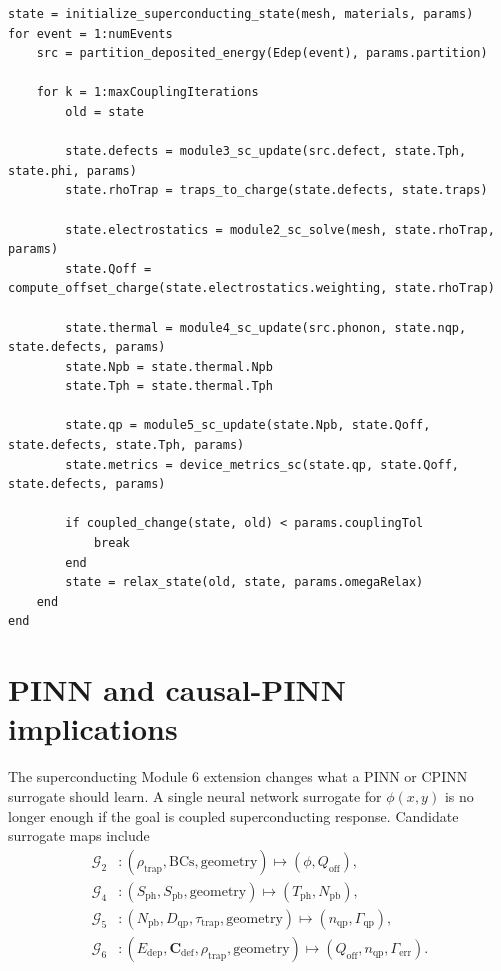 \documentclass[11pt]{article}
\newcommand{\Edep}{E_{\mathrm{dep}}}
\newcommand{\phiE}{\phi}
\newcommand{\Qoff}{Q_{\mathrm{off}}}
\newcommand{\Cvec}{\bm{C}_{\mathrm{def}}}
\newcommand{\Tph}{T_{\mathrm{ph}}}
\newcommand{\Npb}{N_{\mathrm{pb}}}
\newcommand{\nqp}{n_{\mathrm{qp}}}
\newcommand{\Dqp}{D_{\mathrm{qp}}}
\newcommand{\tautrap}{\tau_{\mathrm{trap}}}
\newcommand{\Gammaqp}{\Gamma_{\mathrm{qp}}}
\newcommand{\Gammaerr}{\Gamma_{\mathrm{err}}}
\begin{document}
\begin{verbatim}
state = initialize_superconducting_state(mesh, materials, params)
for event = 1:numEvents
    src = partition_deposited_energy(Edep(event), params.partition)

    for k = 1:maxCouplingIterations
        old = state

        state.defects = module3_sc_update(src.defect, state.Tph, state.phi, params)
        state.rhoTrap = traps_to_charge(state.defects, state.traps)

        state.electrostatics = module2_sc_solve(mesh, state.rhoTrap, params)
        state.Qoff = compute_offset_charge(state.electrostatics.weighting, state.rhoTrap)

        state.thermal = module4_sc_update(src.phonon, state.nqp, state.defects, params)
        state.Npb = state.thermal.Npb
        state.Tph = state.thermal.Tph

        state.qp = module5_sc_update(state.Npb, state.Qoff, state.defects, state.Tph, params)
        state.metrics = device_metrics_sc(state.qp, state.Qoff, state.defects, params)

        if coupled_change(state, old) < params.couplingTol
            break
        end
        state = relax_state(old, state, params.omegaRelax)
    end
end
\end{verbatim}

\section{PINN and causal-PINN implications}

The superconducting Module 6 extension changes what a PINN or CPINN surrogate should learn. A single neural network surrogate for \(\phiE(x,y)\) is no longer enough if the goal is coupled superconducting response. Candidate surrogate maps include
\begin{align}
\mathcal{G}_2 &: (\rho_{\mathrm{trap}},\mathrm{BCs},\mathrm{geometry})\mapsto (\phiE,\Qoff),\\
\mathcal{G}_4 &: (S_{\mathrm{ph}},S_{\mathrm{pb}},\mathrm{geometry})\mapsto (\Tph,\Npb),\\
\mathcal{G}_5 &: (\Npb,\Dqp,\tautrap,\mathrm{geometry})\mapsto (\nqp,\Gammaqp),\\
\mathcal{G}_6 &: (\Edep,\Cvec,\rho_{\mathrm{trap}},\mathrm{geometry})\mapsto (\Qoff,\nqp,\Gammaerr).
\end{align}
\end{document}
